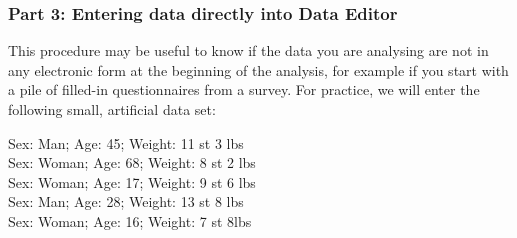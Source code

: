 \documentclass[11pt,a4paper,openany]{book}
\begin{document}
\newpage

\subsubsection*{Part 3: Entering data directly into Data
Editor}\label{part-3-entering-data-directly-into-data-editor}

This procedure may be useful to know if the data you are analysing are
not in any electronic form at the beginning of the analysis, for example
if you start with a pile of filled-in questionnaires from a survey. For
practice, we will enter the following small, artificial data set:

Sex: Man; Age: 45; Weight: 11 st 3 lbs\\
Sex: Woman; Age: 68; Weight: 8 st 2 lbs\\
Sex: Woman; Age: 17; Weight: 9 st 6 lbs\\
Sex: Man; Age: 28; Weight: 13 st 8 lbs\\
Sex: Woman; Age: 16; Weight: 7 st 8lbs
\end{document}
